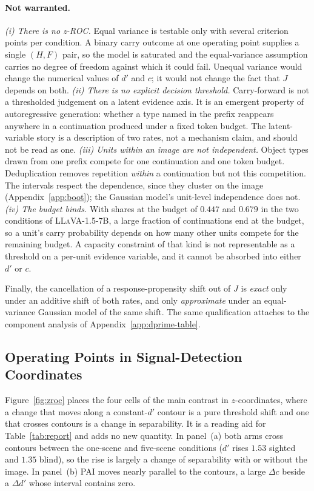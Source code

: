 \paragraph{Not warranted.} \emph{(i) There is no z-ROC.} Equal variance is testable only
with several criterion points per condition. A binary carry outcome at one operating point supplies a
single $(H,F)$ pair, so the model is saturated and the equal-variance assumption carries no degree of
freedom against which it could fail. Unequal variance would change the numerical values of $d'$ and
$c$; it would not change the fact that $J$ depends on both. \emph{(ii) There is no explicit decision
threshold.} Carry-forward is not a thresholded judgement on a latent evidence axis. It is an emergent
property of autoregressive generation: whether a type named in the prefix reappears anywhere in a
continuation produced under a fixed token budget. The latent-variable story is a description of two
rates, not a mechanism claim, and should not be read as one. \emph{(iii) Units within an image are
not independent.} Object types drawn from one prefix compete for one continuation and one token
budget. Deduplication removes repetition \emph{within} a continuation but not this competition. The
intervals respect the dependence, since they cluster on the image
(Appendix~\ref{app:boot}); the Gaussian model's unit-level independence does not. \emph{(iv) The
budget binds.} With shares at the budget of $0.447$ and $0.679$ in the two conditions of \textsc{LLaVA-1.5-7B}, a large fraction of continuations end at the budget, so a unit's carry probability depends
on how many other units compete for the remaining budget. A capacity constraint of that kind is not
representable as a threshold on a per-unit evidence variable, and it cannot be absorbed into either
$d'$ or $c$.

Finally, the cancellation of a response-propensity shift out of $J$ is \emph{exact} only under an
additive shift of both rates, and only \emph{approximate} under an equal-variance Gaussian model of
the same shift. The same qualification attaches to the component analysis of
Appendix~\ref{app:dprime-table}.



\subsection{Operating Points in Signal-Detection Coordinates}
\label{app:zroc}

Figure~\ref{fig:zroc} places the four cells of the main contrast in $z$-coordinates, where a change
that moves along a constant-$d'$ contour is a pure threshold shift and one that crosses contours is a
change in separability. It is a reading aid for Table~\ref{tab:report} and adds no new quantity. In panel~(a)
both arms cross contours between the one-scene and five-scene conditions ($d'$ rises $1.53$ sighted
and $1.35$ blind), so the rise is largely a change of separability with or without the image. In
panel~(b) PAI moves nearly parallel to the contours, a large $\Delta c$ beside a $\Delta d'$ whose
interval contains zero.

